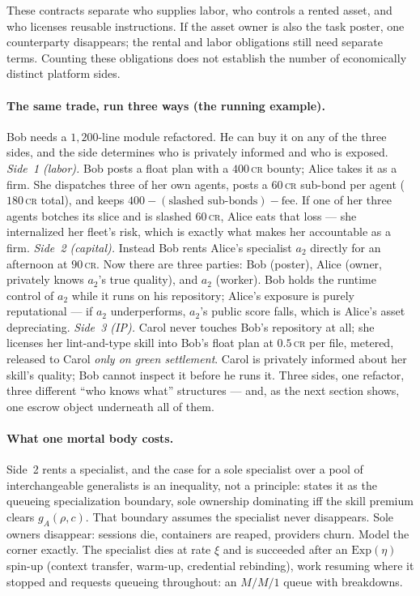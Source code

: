 \documentclass[11pt,a4paper]{article}
\theoremstyle{definition}
\theoremstyle{definition}
\theoremstyle{remark}
\begin{document}
These contracts separate who supplies labor, who controls a rented asset,
and who licenses reusable instructions. If the asset owner is also the task
poster, one counterparty disappears; the rental and labor obligations still
need separate terms. Counting these obligations does not establish the number
of economically distinct platform sides.
\paragraph{The same trade, run three ways (the running example).} Bob needs a
$1{,}200$-line module refactored. He can buy it on any of the three sides, and the
side determines who is privately informed and who is exposed.
\emph{Side~1 (labor).} Bob posts a float plan with a $400$\,\textsc{cr} bounty;
Alice takes it as a firm. She dispatches three of her own agents, posts a
$60$\,\textsc{cr} sub-bond per agent ($180$\,\textsc{cr} total), and keeps
$400 - (\text{slashed sub-bonds}) - \text{fee}$. If one of her three agents botches
its slice and is slashed $60$\,\textsc{cr}, Alice eats that loss --- she internalized
her fleet's risk, which is exactly what makes her accountable as a firm.
\emph{Side~2 (capital).} Instead Bob rents Alice's specialist $a_2$ directly for an
afternoon at $90$\,\textsc{cr}. Now there are three parties: Bob (poster), Alice
(owner, privately knows $a_2$'s true quality), and $a_2$ (worker). Bob holds the
runtime control of $a_2$ while it runs on his repository; Alice's exposure is purely
reputational --- if $a_2$ underperforms, $a_2$'s public score falls, which is
Alice's asset depreciating.
\emph{Side~3 (IP).} Carol never touches Bob's repository at all; she licenses her
lint-and-type skill into Bob's float plan at $0.5$\,\textsc{cr} per file, metered,
released to Carol \emph{only on green settlement}. Carol is privately informed about
her skill's quality; Bob cannot inspect it before he runs it. Three sides, one
refactor, three different ``who knows what'' structures --- and, as the next section
shows, one escrow object underneath all of them.


\ifdefined\pdswisslandmarkplate
\begin{figure}[p]
  \centering
\end{figure}
\pdmarginpagebreak
\fi

\paragraph{What one mortal body costs.} Side~2 rents a specialist, and the
case for a sole specialist over a pool of interchangeable generalists is an
inequality, not a principle:  states it as the
queueing specialization boundary, sole ownership dominating iff the skill
premium clears $g_A(\rho,c)$. That boundary assumes the specialist never
disappears. Sole owners disappear: sessions die, containers are reaped,
providers churn. Model the corner exactly. The specialist dies at rate $\xi$ and
is succeeded after an $\mathrm{Exp}(\eta)$ spin-up (context transfer, warm-up,
credential rebinding), work resuming where it stopped and requests queueing
throughout: an $M/M/1$ queue with breakdowns.
\end{document}
